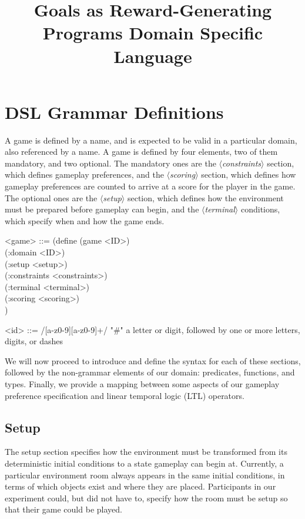 \documentclass{article}
\title{Goals as Reward-Generating Programs Domain Specific Language}
\newcommand{\dsl}[1]{{\it $\langle$#1$\rangle$}}
\begin{document}
\maketitle

\section{DSL Grammar Definitions}

A game is defined by a name, and is expected to be valid in a particular domain, also referenced by a name.
A game is defined by four elements, two of them mandatory, and two optional.
The mandatory ones are the \dsl{constraints} section, which defines gameplay preferences, and the \dsl{scoring} section, which defines how gameplay preferences are counted to arrive at a score for the player in the game.
The optional ones are the \dsl{setup} section, which defines how the environment must be prepared before gameplay can begin, and the \dsl{terminal} conditions, which specify when and how the game ends.

\begin{grammar}
<game> ::= (define (game <ID>) \\
  (:domain <ID>) \\
  (:setup <setup>) \\
  (:constraints <constraints>) \\
  (:terminal <terminal>) \\
  (:scoring <scoring>) \\)

<id> ::= /[a-z0-9][a-z0-9\-]+/  "#" a letter or digit, followed by one or more letters, digits, or dashes
\end{grammar}

We will now proceed to introduce and define the syntax for each of these sections, followed by the non-grammar elements of our domain: predicates, functions, and types.
Finally, we provide a mapping between some aspects of our gameplay preference specification and linear temporal logic (LTL) operators.

\subsection{Setup} \label{sec:setup}
The setup section specifies how the environment must be transformed from its deterministic initial conditions to a state gameplay can begin at.
Currently, a particular environment room always appears in the same initial conditions, in terms of which objects exist and where they are placed.
Participants in our experiment could, but did not have to, specify how the room must be setup so that their game could be played.
\end{document}
